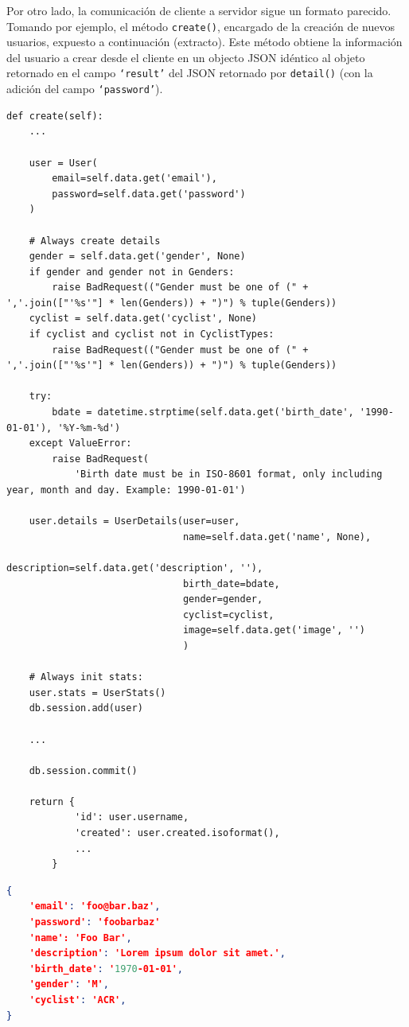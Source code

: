 \documentclass[11pt,letterpaper]{article}
\begin{document}
Por otro lado, la comunicación de cliente a servidor sigue un formato parecido. Tomando por ejemplo, el método \texttt{create()}, encargado de la creación de nuevos usuarios, expuesto a continuación (extracto). Este método obtiene la información del usuario a crear desde el cliente en un objecto JSON idéntico al objeto retornado en el campo \texttt{`result'} del JSON retornado por \texttt{detail()} (con la adición del campo \texttt{`password'}).
\begin{lstlisting}[title=Extracto del método de creación de usuarios.]
def create(self):
    ...

    user = User(
        email=self.data.get('email'),
        password=self.data.get('password')
    )

    # Always create details
    gender = self.data.get('gender', None)
    if gender and gender not in Genders:
        raise BadRequest(("Gender must be one of (" + ','.join(["'%s'"] * len(Genders)) + ")") % tuple(Genders))
    cyclist = self.data.get('cyclist', None)
    if cyclist and cyclist not in CyclistTypes:
        raise BadRequest(("Gender must be one of (" + ','.join(["'%s'"] * len(Genders)) + ")") % tuple(Genders))

    try:
        bdate = datetime.strptime(self.data.get('birth_date', '1990-01-01'), '%Y-%m-%d')
    except ValueError:
        raise BadRequest(
            'Birth date must be in ISO-8601 format, only including year, month and day. Example: 1990-01-01')

    user.details = UserDetails(user=user,
                               name=self.data.get('name', None),
                               description=self.data.get('description', ''),
                               birth_date=bdate,
                               gender=gender,
                               cyclist=cyclist,
                               image=self.data.get('image', '')
                               )

    # Always init stats:
    user.stats = UserStats()
    db.session.add(user)

    ...

    db.session.commit()

    return {
            'id': user.username,
            'created': user.created.isoformat(),
            ...
        }
\end{lstlisting}
\begin{lstlisting}[language=json, title=Ejemplo de datos para solicitud de creación de usuario.]
{
    'email': 'foo@bar.baz',
    'password': 'foobarbaz'
    'name': 'Foo Bar',
    'description': 'Lorem ipsum dolor sit amet.',
    'birth_date': '1970-01-01',
    'gender': 'M',
    'cyclist': 'ACR',
}
\end{lstlisting}
\end{document}
